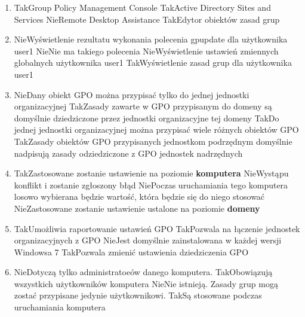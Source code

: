 \begin{enumerate}
		\item {}%
		{Tak}{Group Policy Management Console}%
		{Tak}{Active Directory Sites and Services}%
		{Nie}{Remote Desktop Assistance}%
		{Tak}{Edytor obiektów zasad grup}
		
		\item {}%
		{Nie}{Wyświetlenie rezultatu wykonania polecenia gpupdate dla użytkownika user1}%
		{Nie}{Nie ma takiego polecenia}%
		{Nie}{Wyświetlenie ustawień zmiennych globalnych użytkownika user1}%
		{Tak}{Wyświetlenie zasad grup dla użytkownika user1}
		
		\item {}%
		{Nie}{Dany obiekt GPO można przypisać tylko do jednej jednostki organizacyjnej}%
		{Tak}{Zasady zawarte w GPO przypisanym do domeny są domyślnie dziedziczone przez jednostki organizacyjne tej domeny}%
		{Tak}{Do jednej jednostki organizacyjnej można przypisać wiele różnych obiektów GPO}%
		{Tak}{Zasady obiektów GPO przypisanych jednostkom podrzędnym domyślnie nadpisują zasady odziedziczone z GPO jednostek nadrzędnych}
		
		\item {}%
		{Tak}{Zastosowane zostanie ustawienie na poziomie \textbf{komputera}}%
		{Nie}{Wystąpu konflikt i zostanie zgłoszony błąd}%
		{Nie}{Poczas uruchamiania tego komputera losowo wybierana będzie wartość, która będzie się do niego stosować}%
		{Nie}{Zastosowane zostanie ustawienie ustalone na poziomie \textbf{domeny}}
		
		\item {}%
		{Tak}{Umożliwia raportowanie ustawień GPO}%
		{Tak}{Pozwala na łączenie jednostek organizacyjnych z GPO}%
		{Nie}{Jest domyślnie zainstalowana w każdej wersji Windowsa 7}%
		{Tak}{Pozwala zmienić ustawienia dziedziczenia GPO}%
		
		\item {}%
		{Nie}{Dotyczą tylko administratoeów danego komputera.}%
		{Tak}{Obowiązują wszystkich użytkowników komputera}%
		{Nie}{Nie istnieją. Zasady grup mogą zostać przypisane jedynie użytkownikowi.}%
		{Tak}{Są stosowane podczas uruchamiania komputera}
		

\end{enumerate}
